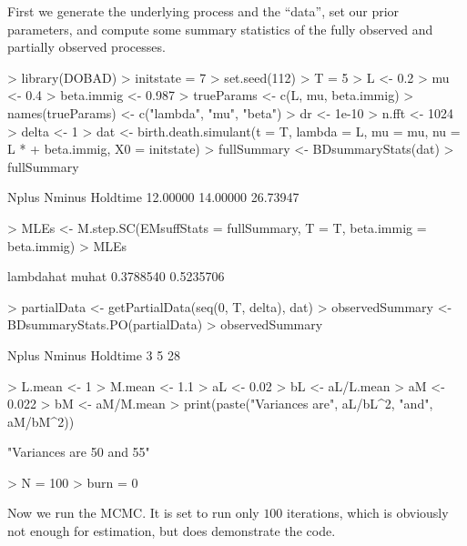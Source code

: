 \documentclass[12pt]{article}
\begin{document}
First we generate the underlying process and the ``data'', set our
prior parameters, and compute some summary statistics of the fully
observed and partially observed processes.
\begin{Schunk}
\begin{Sinput}
> library(DOBAD)
> initstate = 7
> set.seed(112)
> T = 5
> L <- 0.2
> mu <- 0.4
> beta.immig <- 0.987
> trueParams <- c(L, mu, beta.immig)
> names(trueParams) <- c("lambda", "mu", "beta")
> dr <- 1e-10
> n.fft <- 1024
> delta <- 1
> dat <- birth.death.simulant(t = T, lambda = L, mu = mu, nu = L * 
+    beta.immig, X0 = initstate)
> fullSummary <- BDsummaryStats(dat)
> fullSummary
\end{Sinput}
\begin{Soutput}
   Nplus   Nminus Holdtime 
12.00000 14.00000 26.73947 
\end{Soutput}
\begin{Sinput}
> MLEs <- M.step.SC(EMsuffStats = fullSummary, T = T, beta.immig = beta.immig)
> MLEs
\end{Sinput}
\begin{Soutput}
lambdahat     muhat 
0.3788540 0.5235706 
\end{Soutput}
\begin{Sinput}
> partialData <- getPartialData(seq(0, T, delta), dat)
> observedSummary <- BDsummaryStats.PO(partialData)
> observedSummary
\end{Sinput}
\begin{Soutput}
   Nplus   Nminus Holdtime 
       3        5       28 
\end{Soutput}
\begin{Sinput}
> L.mean <- 1
> M.mean <- 1.1
> aL <- 0.02
> bL <- aL/L.mean
> aM <- 0.022
> bM <- aM/M.mean
> print(paste("Variances are", aL/bL^2, "and", aM/bM^2))
\end{Sinput}
\begin{Soutput}
[1] "Variances are 50 and 55"
\end{Soutput}
\begin{Sinput}
> N = 100
> burn = 0
\end{Sinput}
\end{Schunk}

Now we run the MCMC.  It is set to run only $100$ iterations, which is
obviously not enough for estimation, but does demonstrate the code.
\end{document}
